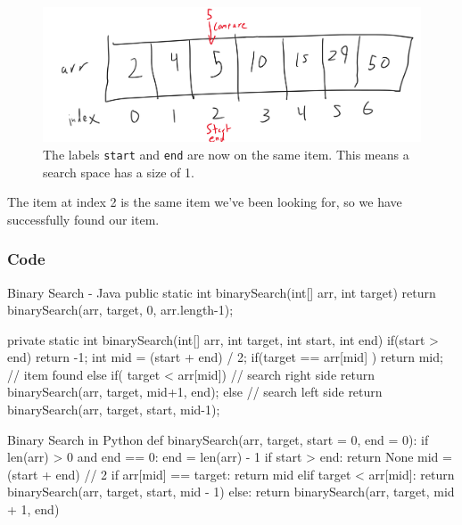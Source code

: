 \begin{figure}[h!]
	\centering
	\includegraphics[width=0.7\linewidth]{pics/binarySearch4}
	\caption{The labels \texttt{start} and \texttt{end} are now on the same item.  This means a search space has a size of 1.}
	\label{fig:binarysearch4}
\end{figure}


The item at index 2 is the same item we've been looking for, so we have successfully found our item.

\subsubsection{Code}



\begin{javacode}[listing and comment, comment={Our outer, wrapper function exists to have a clean function to call.  Our helper function does the actual work.  If we fail to find our target, we will return -1, which is an invalid index.}]{Binary Search - Java}
public static int binarySearch(int[] arr, int target) {
	return binarySearch(arr, target, 0, arr.length-1);
}

private static int binarySearch(int[] arr, int target, int start, int end) {
	if(start > end) {
		return -1;
	}
	int mid = (start + end) / 2;
	if(target == arr[mid] ) {
		return mid; // item found
	} else if( target < arr[mid]) {
		// search right side
		return binarySearch(arr, target, mid+1, end);
	} else {
		// search left side
		return binarySearch(arr, target, start, mid-1);
	}
}
\end{javacode}


\begin{pycode}[listing and comment, comment={Here, we have two base arguments for our initial call, with start and end to be used for a recursive call.  The first if statement is to set \texttt{end} correctly for our topmost (initial) call, because I'm too lazy to write a second, private helper function.  The first base case returns \texttt{None} to represent a failure to find.}]{Binary Search in Python}
def binarySearch(arr, target, start = 0, end = 0):
	if len(arr) > 0 and end == 0:
		end = len(arr) - 1
	if start > end:
		return None
	mid = (start + end) // 2
	if arr[mid] == target:
		return mid
	elif target < arr[mid]:
		return binarySearch(arr, target, start, mid - 1)
	else:
		return binarySearch(arr, target, mid + 1, end)
\end{pycode}

